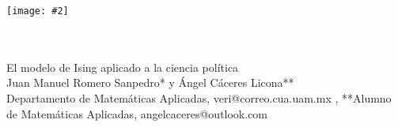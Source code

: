 \documentclass[portrait, a0b,final]{a0poster}%
\numberwithin{equation}{section}
\newcommand{\uamlogo}[3][2pt]{
    \psset{unit=#2,linewidth=#1 }
    \psline*[linearc=.25,linecolor=#3](2.8,2)(2,2)(1.8,0)(2.8,2)(3.8,0)(3.6,2)(2,2)(1.8,0)
    \psline*[linecolor=#3](0,0)(.8,0)(1.8,2)(1,2)(0,0)
    \psline*[linecolor=#3](4.8,0)(3.8,2)(4.6,2)(5.6,0)(4.8,0)
    \psline*[linearc=.25,linecolor=#3](3.8,0)(2.8,2)(3.6,2)(4.6,0)(3.8,0)
    \psline*[linearc=.25,linecolor=#3](4.6,0)(3.8,0)(2.8,2)(3.6,2)(4.6,0)
    \rput{180}(5.6,2){%
    \psline*[linearc=.25,linecolor=white](2.8,2)(2,2)(1.8,0)(2.8,2)(3.8,0)(3.6,2)(2,2)(1.8,0)
    \psline*[linearc=.25,linecolor=white](1,0)(1.8,0)(2.8,2)(2,2)(1,0)
    \psline*[linearc=.25,linecolor=white](1.8,0)(1,0)(2,2)(2.8,2)(1.8,0)
    \psline*[linearc=.25,linecolor=white](3.8,0)(2.8,2)(3.6,2)(4.6,0)(3.8,0)
    \psline*[linearc=.25,linecolor=white](4.6,0)(3.8,0)(2.8,2)(3.6,2)(4.6,0)
    \psline[linearc=.25,linecolor=#3](1,0)(2,2)(3.6,2)(4.6,0)
    \psline[linecolor=#3](1,0)(1.8,0)
    \psline[linearc=.25,linecolor=#3](4.6,0)(3.8,0)
    \psline[linearc=.25,linecolor=#3](1.8,0)(2.8,2)(3.8,0)}
    \psline*[linearc=.25,linecolor=#3](1,0)(1.8,0)(2.8,2)(2,2)(1,0)
    \psline*[linearc=.25,linecolor=#3](1.8,0)(1,0)(2,2)(2.8,2)(1.8,0)}
\newenvironment{poster}{
  \begin{center}
  \begin{minipage}[c]{0.98\textwidth}
}{
  \end{minipage}
  \end{center}
}
\newenvironment{pcolumn}[1]{
  \begin{minipage}{#1\textwidth}
  \begin{center}
}{
  \end{center}
  \end{minipage}
}
\newcommand{\myfig}[3][0]{
\begin{center}
  \vspace{1.5cm}
  \texttt{[image: \#2]}
  \nobreak\medskip
\end{center}}
\newcommand{\mycaption}[1]{
  \vspace{0.5cm}
  \begin{quote}
    {{\sc Figura} \arabic{figure}: #1}
  \end{quote}
  \vspace{1cm}
  \stepcounter{figure}
}
\begin{document}
\begin{poster}
\begin{center}
\begin{pcolumn}{0.98}
{%
\begin{minipage}[c][9.5cm][c]{0.15\textwidth}                                %
  \begin{center}
        \begin{center}
           \myfig{logogrande.ps}{1.0}    
        \end{center}
  \end{center}
\end{minipage}
\begin{minipage}[c][9.5cm][c]{0.80\textwidth}                                 %
  \begin{center}
    {\sc {\textcolor{rojo}{\Huge Congreso internacional de}}}\\[4mm]
    {\sc {\textcolor{rojo}{\Huge Matem\'aticas y sus aplicaciones.}} }\\[8mm]
    {\sc \Huge El modelo de Ising aplicado a la ciencia pol\'itica}\\[4mm]
    {\Large Juan Manuel Romero Sanpedro* y \'Angel C\'aceres Licona**} \\
    {\large *Departamento de Matem\'aticas Aplicadas, veri@correo.cua.uam.mx , **Alumno de Matem\'aticas Aplicadas, angelcaceres@outlook.com} \\%
  \end{center}
\end{minipage}


}
\end{pcolumn}
\end{center}
\end{poster}
\end{document}
